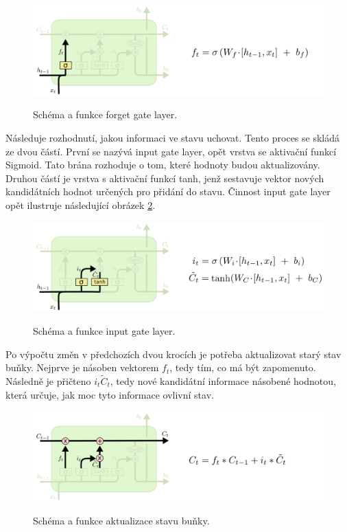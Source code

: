 \begin{figure}[h]\centering
    \centering
    \includegraphics[width=0.8\linewidth]{obrazky/LSTM3-focus-f.png}\\[1pt]  
    \caption{Schéma a funkce forget gate layer. \cite{colah_lstm}}    
    \label{obrazekForgetGate}
\end{figure}

Následuje rozhodnutí, jakou informaci ve stavu uchovat.
Tento proces se skládá ze dvou částí.
První se nazývá input gate layer, 
opět vrstva se aktivační funkcí Sigmoid.
Tato brána rozhoduje o tom, které hodnoty budou aktualizovány.
Druhou částí je vrstva s aktivační funkcí tanh,
jenž sestavuje vektor nových kandidátních hodnot
určených pro přidání do stavu.\cite{colah_lstm}
Činnost input gate layer opět ilustruje následující obrázek \ref{obrazekInputLayer}.

\begin{figure}[h]\centering
    \centering
    \includegraphics[width=0.8\linewidth]{obrazky/LSTM3-focus-i.png}\\[1pt]  
    \caption{Schéma a funkce input gate layer. \cite{colah_lstm}}    
    \label{obrazekInputLayer}
\end{figure}

Po výpočtu změn v předchozích dvou krocích
je potřeba aktualizovat starý stav buňky.
Nejprve je násoben vektorem $f_t$, tedy tím, co má být zapomenuto.
Následně je přičteno $i_t\tilde{C}_t $, 
tedy nové kandidátní informace násobené hodnotou,
která určuje, jak moc tyto informace ovlivní stav.\cite{colah_lstm}

\begin{figure}[h]\centering
    \centering
    \includegraphics[width=0.8\linewidth]{obrazky/LSTM3-focus-C.png}\\[1pt]  
    \caption{Schéma a funkce aktualizace stavu buňky. \cite{colah_lstm}}    
    \label{obrazekAktualizaceLSTM}
\end{figure}

